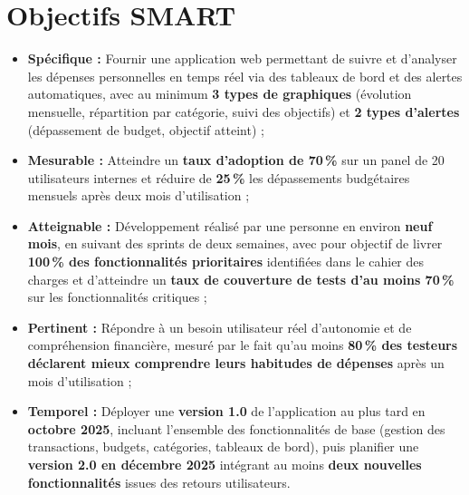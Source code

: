 
\section{Objectifs SMART}

\begin{tcolorbox}[colback=green!5!white,colframe=green!60!black,title=\textbf{Objectifs SMART du projet}]
\begin{itemize}
    \item \textbf{Spécifique :} Fournir une application web permettant de suivre et d’analyser les dépenses personnelles en temps réel via des tableaux de bord et des alertes automatiques, avec au minimum \textbf{3 types de graphiques} (évolution mensuelle, répartition par catégorie, suivi des objectifs) et \textbf{2 types d’alertes} (dépassement de budget, objectif atteint) ;

    \item \textbf{Mesurable :} Atteindre un \textbf{taux d’adoption de 70\,\%} sur un panel de 20 utilisateurs internes et réduire de \textbf{25\,\%} les dépassements budgétaires mensuels après deux mois d’utilisation ;

    \item \textbf{Atteignable :} Développement réalisé par une personne en environ \textbf{neuf mois}, en suivant des sprints de deux semaines, avec pour objectif de livrer \textbf{100\,\% des fonctionnalités prioritaires} identifiées dans le cahier des charges et d’atteindre un \textbf{taux de couverture de tests d’au moins 70\,\%} sur les fonctionnalités critiques ;

    \item \textbf{Pertinent :} Répondre à un besoin utilisateur réel d’autonomie et de compréhension financière, mesuré par le fait qu’au moins \textbf{80\,\% des testeurs déclarent mieux comprendre leurs habitudes de dépenses} après un mois d’utilisation ;

    \item \textbf{Temporel :} Déployer une \textbf{version 1.0} de l’application au plus tard en \textbf{octobre 2025}, incluant l’ensemble des fonctionnalités de base (gestion des transactions, budgets, catégories, tableaux de bord), puis planifier une \textbf{version 2.0 en décembre 2025} intégrant au moins \textbf{deux nouvelles fonctionnalités} issues des retours utilisateurs.
\end{itemize}
\end{tcolorbox}

